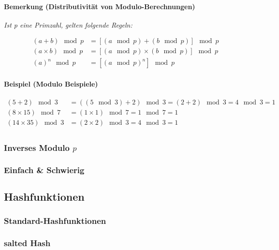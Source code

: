 \paragraph*{Bemerkung (Distributivität von Modulo-Berechnungen)}
\emph{Ist p eine Primzahl, gelten folgende Regeln:}

\begin{align}
    \label{eq:mod}
    (a + b) \mod p &= [(a \mod p) + (b \mod p)] \mod p             \\
    (a \times b) \mod p &= [(a \mod p) \times (b \mod p)] \mod p   \\
    (a)^n \mod p &= [(a \mod p)^n] \mod p
\end{align}

\paragraph*{Beispiel (Modulo Beispiele)}

\begin{align*}
    (5 + 2)\mod 3 &= ((5\mod 3) + 2) \mod 3 = (2 + 2) \mod 3 = 4 \mod 3 = 1 \\
    (8 \times 15) \mod 7 &= (1 \times 1) \mod 7 = 1 \mod 7 = 1              \\
    (14 \times 35) \mod 3 &= (2 \times 2) \mod 3 = 4 \mod 3 = 1             \\
\end{align*}

\subsubsection*{Inverses Modulo $p$}

\subsubsection*{Einfach \& Schwierig}
\label{subsubsec:einfach}

\subsection{Hashfunktionen}
\label{subsec:hash}

\subsubsection*{Standard-Hashfunktionen}
\subsubsection*{salted Hash}

